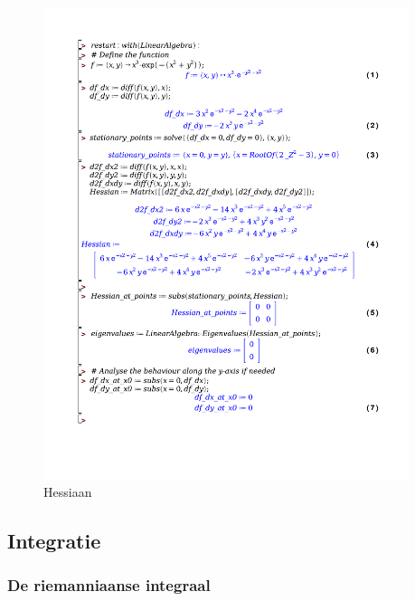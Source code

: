 \documentclass[a4paper]{article}
\begin{document}
\begin{figure}[H]
	\begin{center}
		\includegraphics[width=0.95\textwidth]{./hessian.pdf}
	\end{center}
	\caption{Hessiaan}
	\label{}
\end{figure}

\subsection{Integratie}

\subsubsection{De riemanniaanse integraal}
\end{document}

